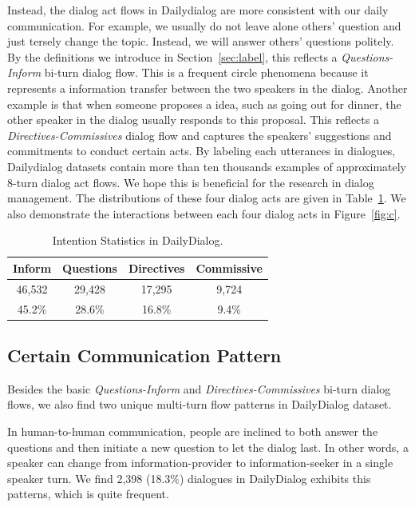 \documentclass[11pt,letterpaper]{article}
\begin{document}
Instead, the dialog act flows in Dailydialog are more consistent with our daily communication. For example, we usually do not leave alone others' question and just tersely change the topic. Instead, we will answer others' questions politely. By the definitions we introduce in Section~\ref{sec:label}, this reflects a \emph{Questions-Inform} bi-turn dialog flow. This is a frequent circle phenomena because it represents a information transfer between the two speakers in the dialog. Another example is that when someone proposes a idea, such as going out for dinner, the other speaker in the dialog usually responds to this proposal. This reflects a \emph{Directives-Commissives} dialog flow and captures the speakers' suggestions and commitments to conduct certain acts. By labeling each utterances in dialogues, Dailydialog datasets contain more than ten thousands examples of approximately 8-turn dialog act flows. We hope this is beneficial for the research in dialog management. The distributions of these four dialog acts are given in Table~\ref{intention}. We also demonstrate the interactions between each four dialog acts in Figure~\ref{fig:c}.

\begin{table}[h]
\centering
\begin{tabular}{cccc}
\toprule
Inform & Questions & Directives & Commissive \\
\midrule
46,532&29,428&17,295&9,724 \\
45.2\%&28.6\%& 16.8\%&9.4\% \\
\bottomrule
\end{tabular}
\caption{Intention Statistics in DailyDialog.}
\label{intention}
\end{table}

\subsection{Certain Communication Pattern}
Besides the basic \emph{Questions-Inform} and \emph{Directives-Commissives} bi-turn dialog flows, we also find two unique multi-turn flow patterns in DailyDialog dataset. 

 In human-to-human communication, people are inclined to both answer the questions and then initiate a new question to let the dialog last. In other words, a speaker can change from information-provider to information-seeker in a single speaker turn. We find 2,398 (18.3\%) dialogues in DailyDialog exhibits this patterns, which is quite frequent.
\end{document}
